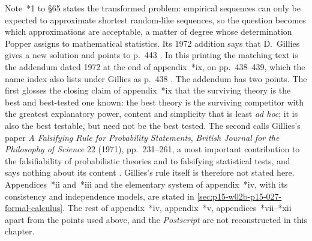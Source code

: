 Note~*1 to \S65 states the transformed problem: empirical sequences can
only be expected to approximate shortest random-like sequences, so the
question becomes which approximations are acceptable, a matter of degree
whose determination Popper assigns to mathematical statistics. Its 1972
addition says that D.~Gillies gives a new solution and points to
p.~443 \parencite[\S65, note~*1, p.~183]{Popper2002LogicDiscoveryUI}.
In this printing the matching text is the addendum dated 1972 at the end
of appendix~*ix, on pp.~438--439, which the name index also lists under
Gillies as p.~438 \parencite[name index, p.~490; appendix~*ix,
addendum, pp.~438--439]{Popper2002LogicDiscoveryUI}. The addendum has two
points. The first glosses the closing claim of appendix~*ix that the
surviving theory is the best and best-tested one known: the best theory is
the surviving competitor with the greatest explanatory power, content and
simplicity that is least \emph{ad hoc}; it is also the best testable, but
need not be the best tested. The second calls Gillies's paper
\emph{A Falsifying Rule for Probability Statements}, \emph{British
Journal for the Philosophy of Science} 22 (1971), pp.~231--261, a most
important contribution to the falsifiability of probabilistic theories
and to falsifying statistical tests, and says nothing about its content
\parencite[appendix~*ix, addendum, pp.~438--439]{Popper2002LogicDiscoveryUI}.
Gillies's rule itself is therefore not stated here. Appendices~*ii
and~*iii and the elementary system of appendix~*iv, with its consistency
and independence models, are stated in
\cref{sec:p15-w02b-p15-027-formal-calculus}. The rest of appendix~*iv,
appendix~*v, appendices~*vii--*xii apart from the points used above, and
the \emph{Postscript} are not reconstructed in this chapter.
